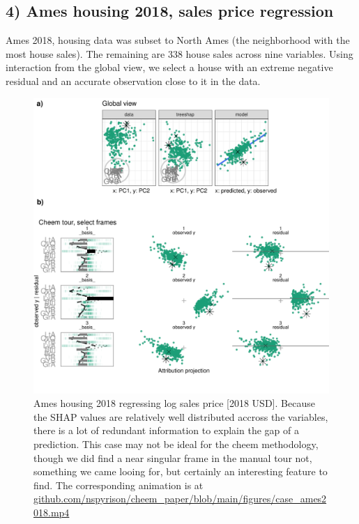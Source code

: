 \documentclass[
  article]{article}
\begin{document}
\hypertarget{ames-housing-2018-sales-price-regression}{%
\subsection{4) Ames housing 2018, sales price regression}\label{ames-housing-2018-sales-price-regression}}

Ames 2018, housing data was subset to North Ames (the neighborhood with the most house sales). The remaining are 338 house sales across nine variables. Using interaction from the global view, we select a house with an extreme negative residual and an accurate observation close to it in the data.



\begin{figure}

{\centering \includegraphics[width=1\linewidth]{./figures/case_ames2018} 

}

\caption{Ames housing 2018 regressing log sales price {[}2018 USD{]}. Because the SHAP values are relatively well distributed accross the variables, there is a lot of redundant information to explain the gap of a prediction. This case may not be ideal for the cheem methodology, though we did find a near singular frame in the manual tour not, something we came looing for, but certainly an interesting feature to find. The corresponding animation is at \href{https://github.com/nspyrison/cheem_paper/blob/main/figures/case_ames2018.mp4}{github.com/nspyrison/cheem\_paper/blob/main/figures/case\_ames2018.mp4}}\label{fig:caseames}
\end{figure}
\end{document}
